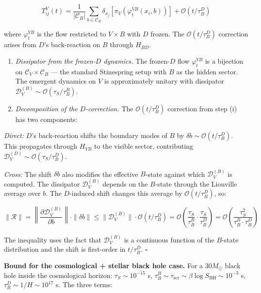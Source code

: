\documentclass[
]{article}
\begin{document}
\[T^V_{ij}(t) = \frac{1}{|\mathcal{C}_B|} \sum_{b \in \mathcal{C}_B} \delta_{x_j}[\pi_V(\varphi_t^{VB}(x_i, b))] + \mathcal{O}(t / \tau_B^D)\]

where \(\varphi_t^{VB}\) is the flow restricted to \(V \times B\) with
\(D\) frozen. The \(\mathcal{O}(t / \tau_B^D)\) correction arises from
\(D\)'s back-reaction on \(B\) through \(H_{BD}\).

\begin{enumerate}
\def\labelenumi{(\roman{enumi})}
\setcounter{enumi}{1}
\item
  \emph{Dissipator from the frozen-\(D\) dynamics.} The frozen-\(D\)
  flow \(\varphi_t^{VB}\) is a bijection on
  \(\mathcal{C}_V \times \mathcal{C}_B\) --- the standard Stinespring
  setup with \(B\) as the hidden sector. The emergent dynamics on \(V\)
  is approximately unitary with dissipator
  \(\mathcal{D}_V^{(B)} \sim \mathcal{O}(\tau_S / \tau_B^B)\).
\item
  \emph{Decomposition of the \(D\)-correction.} The
  \(\mathcal{O}(t / \tau_B^D)\) correction from step (i) has two
  components:
\end{enumerate}

\emph{Direct:} \(D\)'s back-reaction shifts the boundary modes of \(B\)
by \(\delta b \sim \mathcal{O}(t / \tau_B^D)\). This propagates through
\(H_{VB}\) to the visible sector, contributing
\(\mathcal{D}_V^{(D)} \sim \mathcal{O}(\tau_S / \tau_B^D)\).

\emph{Cross:} The shift \(\delta b\) also modifies the effective
\(B\)-state against which \(\mathcal{D}_V^{(B)}\) is computed. The
dissipator \(\mathcal{D}_V^{(B)}\) depends on the \(B\)-state through
the Liouville average over \(b\). The \(D\)-induced shift changes this
average by \(\mathcal{O}(t / \tau_B^D)\), so:

\[\|\mathcal{R}\| = \left\|\frac{\partial \mathcal{D}_V^{(B)}}{\partial b}\right\| \cdot \|\delta b\| \leq \|\mathcal{D}_V^{(B)}\| \cdot \mathcal{O}(t / \tau_B^D) = \mathcal{O}\!\left(\frac{\tau_S}{\tau_B^B} \cdot \frac{\tau_S}{\tau_B^D}\right) = \mathcal{O}\!\left(\frac{\tau_S^2}{\tau_B^B \cdot \tau_B^D}\right)\]

The inequality uses the fact that \(\mathcal{D}_V^{(B)}\) is a
continuous function of the \(B\)-state distribution and the shift is
first-order in \(t / \tau_B^D\). \(\square\)

\textbf{Bound for the cosmological + stellar black hole case.} For a
\(30 M_\odot\) black hole inside the cosmological horizon:
\(\tau_S \sim 10^{-15}\) s,
\(\tau_B^B \sim \tau_{\text{scr}} \sim \beta \log S_{\text{BH}} \sim 10^{-3}\)
s, \(\tau_B^D \sim 1/H \sim 10^{17}\) s. The three terms:
\end{document}
